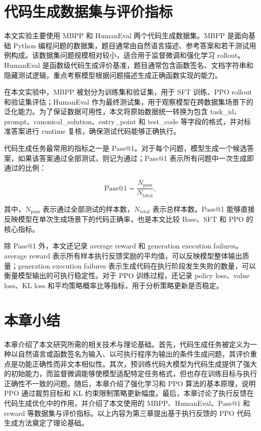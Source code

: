 \section{代码生成数据集与评价指标}

本文实验主要使用 MBPP 和 HumanEval 两个代码生成数据集。MBPP 是面向基础 Python 编程问题的数据集，题目通常由自然语言描述、参考答案和若干测试用例构成。该数据集问题规模相对较小，适合用于监督微调和强化学习 rollout。HumanEval 是函数级代码生成评价基准，题目通常包含函数签名、文档字符串和隐藏测试逻辑，重点考察模型根据问题描述生成正确函数实现的能力\cite{Chen2021Codex}。

在本文实验中，MBPP 被划分为训练集和验证集，用于 SFT 训练、PPO rollout 和验证集评估；HumanEval 作为最终测试集，用于观察模型在跨数据集场景下的泛化能力。为了保证数据可用性，本文将原始数据统一转换为包含 task\_id、prompt、canonical\_solution、entry\_point 和 test\_code 等字段的格式，并对标准答案进行 runtime 复核，确保测试代码能够正确执行。

代码生成任务最常用的指标之一是 Pass@1。对于每个问题，模型生成一个候选答案，如果该答案通过全部测试，则记为通过；Pass@1 表示所有问题中一次生成即通过的比例：

\begin{equation}
  \mathrm{Pass@1}=\frac{N_{\mathrm{pass}}}{N_{\mathrm{total}}},
\end{equation}

其中，$N_{\mathrm{pass}}$ 表示通过全部测试的样本数，$N_{\mathrm{total}}$ 表示总样本数。Pass@1 能够直接反映模型在单次生成场景下的代码正确率，也是本文比较 Base、SFT 和 PPO 的核心指标。

除 Pass@1 外，本文还记录 average reward 和 generation execution failures。average reward 表示所有样本执行反馈奖励的平均值，可以反映模型整体输出质量；generation execution failures 表示生成代码在执行阶段发生失败的数量，可以衡量模型输出的可执行稳定性。对于 PPO 训练过程，还记录 policy loss、value loss、KL loss 和平均策略概率比等指标，用于分析策略更新是否稳定。

\section{本章小结}

本章介绍了本文研究所需的相关技术与理论基础。首先，代码生成任务被定义为一种以自然语言或函数签名为输入、以可执行程序为输出的条件生成问题，其评价重点是功能正确性而非文本相似性。其次，预训练代码大模型为代码生成提供了强大的初始能力，而监督微调能够使模型适配特定任务格式，但也存在训练目标与执行正确性不一致的问题。随后，本章介绍了强化学习和 PPO 算法的基本原理，说明 PPO 通过裁剪目标和 KL 约束限制策略更新幅度。最后，本章讨论了执行反馈在代码生成优化中的作用，并介绍了本文使用的 MBPP、HumanEval、Pass@1 和 reward 等数据集与评价指标。以上内容为第三章提出基于执行反馈的 PPO 代码生成方法奠定了理论基础。
